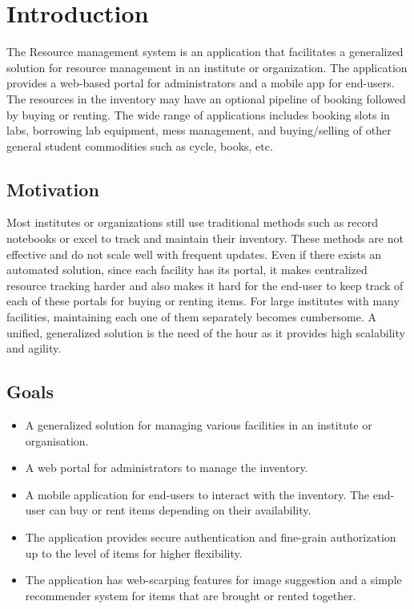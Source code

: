 \chapter{Introduction}
\hspace{3mm}
The Resource management system is an application that facilitates a generalized solution for resource management in an institute or organization. The application provides a web-based portal for administrators and a mobile app for end-users.  The resources in the inventory may have an optional pipeline of booking followed by buying or renting. The wide range of applications includes booking slots in labs, borrowing lab equipment, mess management, and buying/selling of other general student commodities such as cycle, books, etc.
\section{Motivation}
Most institutes or organizations still use traditional methods such as record notebooks or excel to track and maintain their inventory. These methods are not effective and do not scale well with frequent updates. \newline
Even if there exists an automated solution, since each facility has its portal, it makes centralized resource tracking harder and also makes it hard for the end-user to keep track of each of these portals for buying or renting items. For large institutes with many facilities, maintaining each one of them separately becomes cumbersome. A unified, generalized solution is the need of the hour as it provides high scalability and agility. 
\clearpage
\section{Goals}
\begin{itemize}
    \item A generalized solution for managing various facilities in an institute or organisation.
\item A web portal for administrators to manage the inventory. 
\item A mobile application for end-users to interact with the inventory. The end-user can buy or rent items depending on their availability. 
\item The application provides secure authentication and fine-grain authorization up to the level of items for higher flexibility. 
\item The application has web-scarping features for image suggestion and a simple recommender system for items that are brought or rented together. 
\end{itemize}
